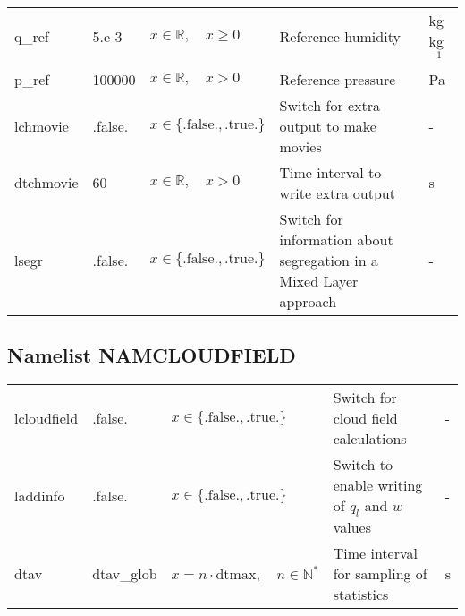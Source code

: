 \documentclass[twoside,11pt,fleqn,a4paper,english,openright]{report}
\begin{document}
\begin{center}
\begin{supertabular}{|l|p{1.6cm}|p{4cm}|p{6cm}|l|}
  q\_ref	& 5.e-3 & $x \in \mathbb{R}, \quad x \ge 0$	&  Reference humidity & kg kg$^{-1}$\\
  p\_ref & 100000 & $x \in \mathbb{R}, \quad x > 0$&  Reference pressure & Pa\\
  lchmovie & .false. &  $x\in\{\text{.false.},\text{.true.}\}$ & Switch for extra output to make movies & -\\
  dtchmovie & 60& $x \in \mathbb{R}, \quad x > 0$& Time interval to write extra output & s\\
  lsegr & .false. & $x\in\{\text{.false.},\text{.true.}\}$ & Switch for information about segregation in a Mixed Layer approach & -\\
\end{supertabular}
\end{center}

\newpage
\subsection{Namelist NAMCLOUDFIELD}\label{par:cloudfield}

\begin{center}
  \tablelasttail{
        &&&&\\\hline
  }
\begin{supertabular}{|l|p{1.6cm}|p{4cm}|p{6cm}|l|}
  lcloudfield	& .false.	& $x\in\{\text{.false.},\text{.true.}\}$	& Switch for cloud field calculations		& -\\
  laddinfo	& .false.	& $x\in\{\text{.false.},\text{.true.}\}$	& Switch to enable writing of $q_l$ and $w$ values	& -\\
  dtav		& dtav\_glob	& $x = n \cdot \text{dtmax}, \quad n \in \mathbb{N}^*$	& Time interval for sampling of statistics	& s\\
\end{supertabular}
\end{center}
\end{document}
